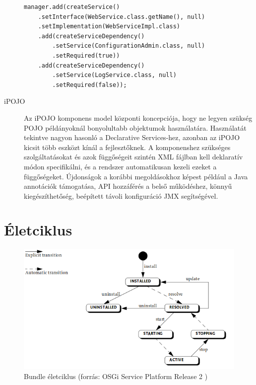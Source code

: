 \begin{description}
\begin{lstlisting}[label={lst:dependencymanager_example}, caption=Példa a DependencyManager használatára,breaklines=true]
manager.add(createService()
    .setInterface(WebService.class.getName(), null)
    .setImplementation(WebServiceImpl.class)
    .add(createServiceDependency()
        .setService(ConfigurationAdmin.class, null)
        .setRequired(true))
    .add(createServiceDependency()
        .setService(LogService.class, null)
        .setRequired(false));
\end{lstlisting}

    \item[iPOJO] Az iPOJO komponens model központi koncepciója, hogy ne legyen szükség POJO példányoknál bonyolultabb objektumok használatára. Használatát tekintve nagyon hasonló a Declarative Services-hez, azonban az iPOJO kicsit több eszközt kínál a fejlesztőknek. A komponenshez szükséges szolgáltatásokat és azok függőségeit szintén XML fájlban kell deklaratív módon specifikálni, és a rendszer automatikusan kezeli ezeket a függőségeket. Újdonságok a korábbi megoldásokhoz képest például a Java annotációk támogatása, API hozzáférés a belső működéshez, könnyű kiegészíthetőség, beépített távoli konfiguráció JMX segítségével.
 
\end{description}


\section{Életciklus}
\label{sec:lifecycle}

\begin{figure}[htb]
\centering
\includegraphics[scale=0.5]{img/bundle_lifecycle}
\caption{Bundle életciklus (forrás: OSGi Service Platform Release 2 \cite{osgi})}
\label{fig:bundle_lifecycle}
\end{figure}

